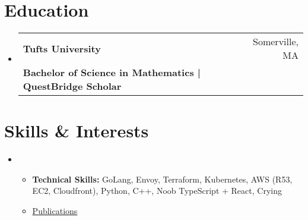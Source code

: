 \documentclass[letterpaper,11pt]{article}
\makeatletter
\newcommand{\cvitem}[1]{
  \item\small{
    {#1\vspace{-2pt}}
  }
}
\newcommand{\cvheading}[4]{
  \vspace{-2pt}\item
    \begin{tabular*}{\textwidth}[t]{l@{\extracolsep{\fill}}r}
      \textbf{#1} & #2 \\
      \small#3 & \small #4 \\
    \end{tabular*}\vspace{-9pt}  %
}
\newcommand{\cvheadingstart}{\begin{itemize}[leftmargin=0in, label={}]}
\newcommand{\cvheadingend}{\end{itemize}}
\newcommand{\cvitemstart}{\begin{itemize}\justifying}
\newcommand{\cvitemend}{\end{itemize}\vspace{-5pt}}
\newcommand{\cvskill}[2]{
  \textcolor{black}{\textbf{#1}}\hfill
  \foreach \x in {1,...,5}{%
    \space{\ifnumgreater{\x}{#2}{\color{black!80!white!20}}{\color{black}}\faSquare}}\par%
  \vspace{-2pt}
}
\makeatother
\begin{document}
\section{Education}
\cvheadingstart
  \cvheading
    {Tufts University}{Somerville, MA}
    {\textbf{Bachelor of Science in Mathematics | QuestBridge Scholar} }{}
\cvheadingend


\section{Skills \& Interests}
\cvheadingstart
\item
\cvitemstart
  \cvitem{\textbf{Technical Skills:} GoLang, Envoy, Terraform, Kubernetes, AWS (R53, EC2, Cloudfront), Python, C++, Noob TypeScript + React, Crying}
  \cvitem{\href{https://arxiv.org/}{Publications}}
\cvitemend
\cvheadingend
\end{document}
